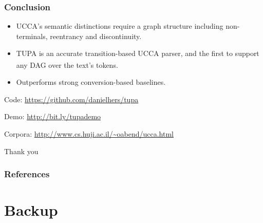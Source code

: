 \documentclass[t]{beamer}
\newcommand{\parser}[1]{TUPA\textsubscript{#1}}
\begin{document}
\begin{frame}
\frametitle{Conclusion}
\begin{itemize}
 \item UCCA's semantic distinctions require a graph structure including {\color{blue}non-terminals}, {\color{orange}reentrancy} and {\color{red}discontinuity}.
 \item \parser{} is an accurate transition-based UCCA parser,
 	and the first to support any DAG over the text's tokens.
 \item Outperforms strong conversion-based baselines.
\end{itemize}


\vfill
Code: \url{https://github.com/danielhers/tupa}

Demo: \url{http://bit.ly/tupademo}

Corpora: \url{http://www.cs.huji.ac.il/~oabend/ucca.html}
\end{frame}



\begin{frame}
\vfill
\begin{center}
\LARGE
Thank you
\end{center}
\end{frame}



\begin{frame}[allowframebreaks]
\frametitle{References}

\tiny
\end{frame}


\section{Backup}
\end{document}
